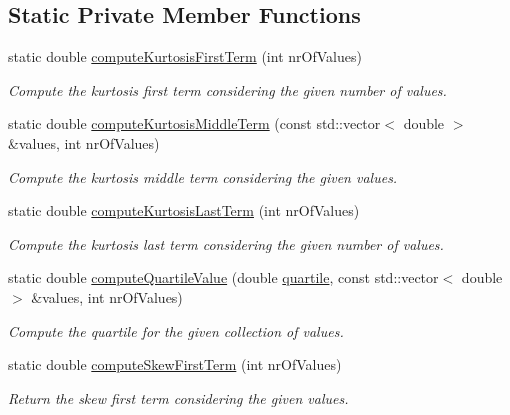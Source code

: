 \subsection*{\-Static \-Private \-Member \-Functions}
\begin{DoxyCompactItemize}
\item 
static double \hyperlink{classmultiscale_1_1Numeric_a1621cda906f63dd3c3866047ef85fefc}{compute\-Kurtosis\-First\-Term} (int nr\-Of\-Values)
\begin{DoxyCompactList}\small\item\em \-Compute the kurtosis first term considering the given number of values. \end{DoxyCompactList}\item 
static double \hyperlink{classmultiscale_1_1Numeric_a4b78b74100f02ec7239c53a34431a602}{compute\-Kurtosis\-Middle\-Term} (const std\-::vector$<$ double $>$ \&values, int nr\-Of\-Values)
\begin{DoxyCompactList}\small\item\em \-Compute the kurtosis middle term considering the given values. \end{DoxyCompactList}\item 
static double \hyperlink{classmultiscale_1_1Numeric_a7c1b060479a2a90f61f55d3a4974f4b8}{compute\-Kurtosis\-Last\-Term} (int nr\-Of\-Values)
\begin{DoxyCompactList}\small\item\em \-Compute the kurtosis last term considering the given number of values. \end{DoxyCompactList}\item 
static double \hyperlink{classmultiscale_1_1Numeric_a4189a889b6207303bfc977f6e0b1218d}{compute\-Quartile\-Value} (double \hyperlink{classmultiscale_1_1Numeric_a127a2b3e5e659b4e493767ba23fc45da}{quartile}, const std\-::vector$<$ double $>$ \&values, int nr\-Of\-Values)
\begin{DoxyCompactList}\small\item\em \-Compute the quartile for the given collection of values. \end{DoxyCompactList}\item 
static double \hyperlink{classmultiscale_1_1Numeric_a5daee6bbc3b6eb9a10db03a7b212af3b}{compute\-Skew\-First\-Term} (int nr\-Of\-Values)
\begin{DoxyCompactList}\small\item\em \-Return the skew first term considering the given values. \end{DoxyCompactList}\item 

\end{DoxyCompactItemize}
